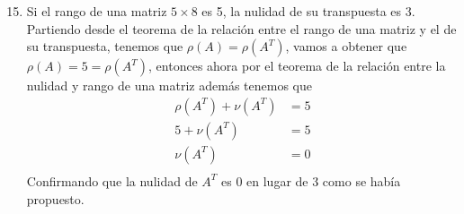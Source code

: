 \begin{enumerate}[label=\listAlph]
        \setcounter{enumii}{14}
        \item Si el rango de una matriz \(5 \times 8\) es 5, la nulidad de su transpuesta es 3. \\ 
            Partiendo desde el teorema de la relación entre el rango de una matriz y el de su transpuesta, tenemos que \(\rho\left(A\right) = \rho\left(A^T\right)\),
            vamos a obtener que \(\rho(A) = 5 = \rho\left(A^T\right)\), entonces ahora por el teorema de la relación entre la nulidad y rango de una matriz además tenemos que 
            \[  
                \begin{aligned}
                    \rho\left(A^T\right) + \nu\left(A^T\right) &= 5 \\
                    5 + \nu\left(A^T\right) &= 5 \\
                    \nu\left(A^T\right) &= 0 \\
                \end{aligned}
            \]
            Confirmando que la nulidad de \(A^T\) es 0 en lugar de 3 como se había propuesto.
    \end{enumerate}
